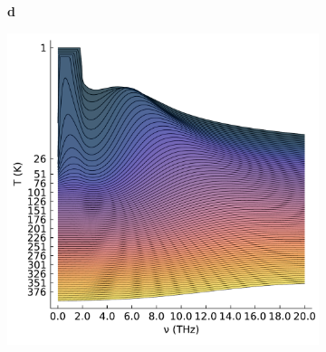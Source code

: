 \begin{figure}
{\begin{subfigure}[b]{.58\textwidth}
\end{subfigure}%
\begin{subfigure}[t]{0.01\textwidth}
    \vspace*{-7.5cm}\textbf{d}
  \end{subfigure}%
\begin{subfigure}[b]{.58\textwidth}
\centering
\includegraphics[width=.88\textwidth]{chapters/frohlich/figures/B_plot_temp_imag.pdf}
\end{subfigure}%
}
\end{figure}
